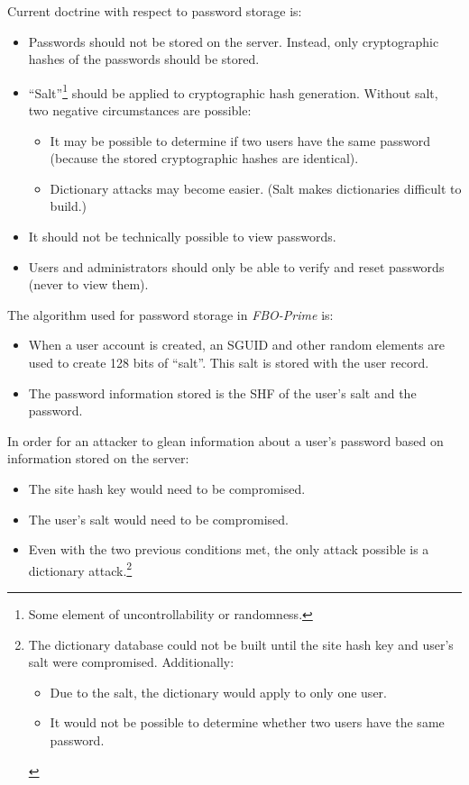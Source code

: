\documentclass[letterpaper,10pt,titlepage]{article}
\newcommand{\productbasename}{FBO-Prime}
\begin{document}
Current doctrine with respect to password storage is:

\begin{itemize}
\item Passwords should not be stored on the server.  Instead, 
      only cryptographic hashes of the passwords should be stored.
\item {}``Salt''\footnote{Some element of uncontrollability or randomness.} should be applied to 
      cryptographic hash generation.  Without salt, two negative 
      circumstances are possible:
      \begin{itemize}
      \item It may be possible to determine if two users have the same password
            (because the stored cryptographic hashes are identical).
      \item Dictionary attacks may become easier.  (Salt makes dictionaries
            difficult to build.)
      \end{itemize}
\item It should not be technically possible to view passwords.
\item Users and administrators should only be able to verify and
      reset passwords (never to view them).
\end{itemize}

The algorithm used for password storage in \emph{\productbasename{}} is:

\begin{itemize}
\item When a user account is created, an SGUID and other 
      random elements are used to create 128 bits of ``salt''.  This salt
      is stored with the user record.
\item The password information stored is the SHF of 
      the user's salt and the password.
\end{itemize}

In order for an attacker to glean information about a user's password
based on information stored on the server:

\begin{itemize}
\item The site hash key would need to be compromised.
\item The user's salt would need to be compromised.
\item Even with the two previous conditions met, the only attack possible
      is a dictionary attack.\footnote{The dictionary database could not be
      built until the site hash key and user's salt were compromised.  Additionally:
      \begin{itemize}
         \item Due to the salt, the dictionary would apply to only one user.
         \item It would not be possible to determine whether two users
               have the same password.
      \end{itemize}}
\end{itemize}
\end{document}
